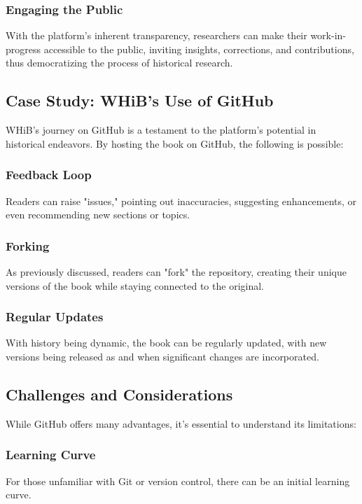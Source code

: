 \documentclass[a4paper,12pt]{book}
\begin{document}
\subsubsection*{Engaging the Public}
With the platform's inherent transparency, researchers can make their work-in-progress accessible to the public, inviting insights, corrections, and contributions, thus democratizing the process of historical research.

\subsection*{Case Study: WHiB's Use of GitHub}
WHiB's journey on GitHub is a testament to the platform's potential in historical endeavors. By hosting the book on GitHub, the following is possible:

\subsubsection*{Feedback Loop}
Readers can raise "issues," pointing out inaccuracies, suggesting enhancements, or even recommending new sections or topics.

\subsubsection*{Forking}
As previously discussed, readers can "fork" the repository, creating their unique versions of the book while staying connected to the original.

\subsubsection*{Regular Updates}
With history being dynamic, the book can be regularly updated, with new versions being released as and when significant changes are incorporated.

\subsection*{Challenges and Considerations}
While GitHub offers many advantages, it's essential to understand its limitations:

\subsubsection*{Learning Curve}
For those unfamiliar with Git or version control, there can be an initial learning curve.
\end{document}
